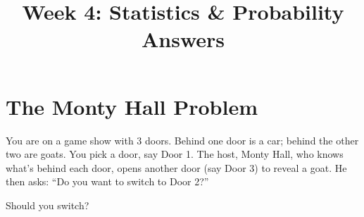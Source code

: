 \documentclass[11pt,a4paper]{article}
\title{\textbf{Week 4: Statistics \& Probability\\Answers}}
\author{}
\date{}
\begin{document}
\sloppy

\maketitle
\tableofcontents
\newpage

\section{The Monty Hall Problem}

\begin{question}
You are on a game show with 3 doors. Behind one door is a car; behind the other two are goats. You pick a door, say Door 1. The host, Monty Hall, who knows what's behind each door, opens another door (say Door 3) to reveal a goat. He then asks: ``Do you want to switch to Door 2?''

Should you switch?
\end{question}
\end{document}

